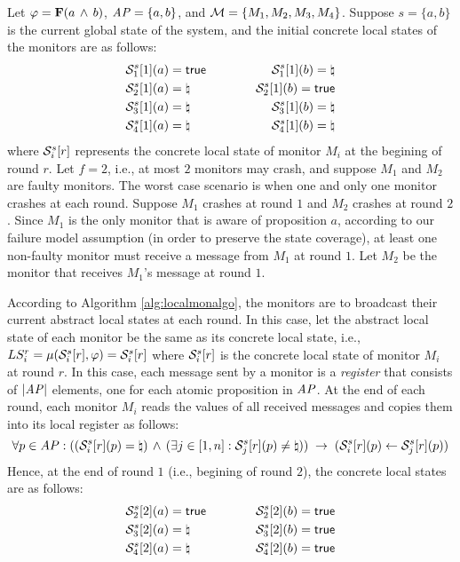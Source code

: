 Let $\varphi = \mathbf{F} (a \, \wedge \, b)$, $\mathit{AP}=\{a, b\}$, and $\mathcal{M} =\{M_1, 
M_2, M_3, M_4\}$. Suppose $s=\{a,b\}$ is the current global state of the 
system, and the initial concrete local states of the monitors are as follows:
\begin{alignat*}{2}
& \mathcal{S}^s_1[1](a)= \mathsf{true} ~~~~~~~~~& \mathcal{S}^s_1[1](b)=\natural\\
& \mathcal{S}^s_2[1](a)= \natural & \mathcal{S}^s_2[1](b) = \mathsf{true} \\
& \mathcal{S}^s_3[1](a) = \natural & \mathcal{S}^s_3[1](b) =\natural \\ 
& \mathcal{S}^s_4[1](a) = \natural & \mathcal{S}^s_4[1](b) =\natural
\end{alignat*}
where $\mathcal{S}^s_i[r]$ represents the concrete local state of monitor 
$M_i$ at the begining of round $r$. Let $f = 2$, i.e., at most $2$ 
monitors may crash, and suppose $M_1$ and $M_2$ are faulty monitors. The 
worst case scenario is when one and only one monitor crashes at each round. 
Suppose $M_1$ crashes at round $1$ and $M_2$ crashes at round $2$. Since $M_1$ 
is the only monitor that is aware of proposition $a$, according to our failure 
model assumption (in order to preserve the state coverage), at least one 
non-faulty monitor must receive a message from $M_1$ at round $1$. Let $M_2$ be 
the monitor that receives $M_1$'s message at round $1$.

According to Algorithm \ref{alg:localmonalgo}, the monitors are to broadcast 
their current abstract local states at each round. In this case, let the 
abstract local state of each monitor be the same as its concrete local state, 
i.e.,  $LS^r_i = \mu (\mathcal{S}^s_i[r], \varphi) = \mathcal{S}^s_i[r]$ where  
$\mathcal{S}^s_i[r]$ is the concrete local state of monitor $M_i$ at round $r$. 
In this case, each message sent by a monitor is a {\em register} that consists 
of $|\mathit{AP}|$ elements, one for each atomic proposition in $\mathit{AP}$. At the end of 
each round, each monitor $M_i$ reads the values of all received messages and 
copies them into its local register as follows:
$$\forall p \in AP: (   (\mathcal{S}_i^s[r](p) = \natural) \, \wedge \, (\exists j 
\in[1,n]:  \mathcal{S}_j^s[r](p) \neq \natural) ) \; \rightarrow \;
(\mathcal{S}_i^s[r](p) \gets \mathcal{S}_j^s[r](p))$$
Hence, at the end of round $1$ (i.e., begining of round $2$), the concrete 
local states are as follows:
\begin{alignat*}{2}
&\mathcal{S}^s_2[2](a)=\mathsf{true} ~~~~~~~~~& \mathcal{S}^s_2[2](b) = \mathsf{true} \\
&\mathcal{S}^s_3[2](a) =\natural & \mathcal{S}^s_3[2](b) = \mathsf{true} \\
&\mathcal{S}^s_4[2](a) =\natural & \mathcal{S}^s_4[2](b) =\mathsf{true}
\end{alignat*}

